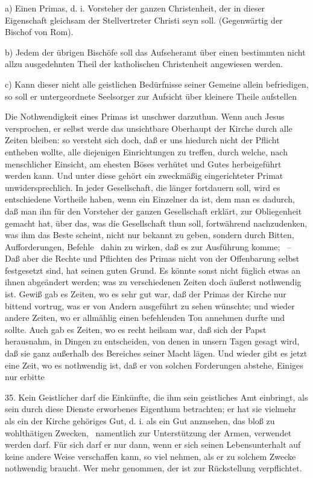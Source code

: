 {a) Einen Primas, d. i. Vorsteher der ganzen Christenheit, der in dieser Eigenschaft gleichsam der Stellvertreter Christi seyn soll. (Gegenwärtig der Bischof von Rom). \par
b) Jedem der übrigen Bischöfe soll das Aufseheramt über einen bestimmten nicht allzu ausgedehnten Theil der katholischen Christenheit angewiesen werden. \par
c) Kann dieser nicht alle geistlichen Bedürfnisse seiner Gemeine allein befriedigen, so soll er untergeordnete Seelsorger zur Aufsicht über kleinere Theile aufstellen \usw\ \par
Die Nothwendigkeit eines Primas ist unschwer darzuthun. Wenn auch Jesus versprochen, er selbst werde das unsichtbare Oberhaupt der Kirche durch alle Zeiten bleiben: so versteht sich doch, daß er uns hiedurch nicht der Pflicht entheben wollte, alle diejenigen Einrichtungen zu treffen, durch welche, nach menschlicher Einsicht, am ehesten Böses verhütet und Gutes herbeigeführt werden kann. Und unter diese gehört ein zweckmäßig eingerichteter Primat unwidersprechlich. In jeder Gesellschaft, die länger fortdauern soll, wird es entschiedene Vortheile haben, wenn ein Einzelner da ist, dem man es dadurch, daß man ihn für den Vorsteher der ganzen Gesellschaft erklärt, zur Obliegenheit gemacht hat, über das, was die Gesellschaft thun soll, fortwährend nachzudenken, was ihm das Beste scheint, nicht nur bekannt zu geben, sondern durch Bitten, Aufforderungen, Befehle \udgl\  dahin zu wirken, daß es zur Ausführung komme; \usw\  -- Daß aber die Rechte und Pflichten des Primas nicht von der Offenbarung selbst festgesetzt sind, hat seinen guten Grund. Es könnte sonst nicht füglich etwas an ihnen abgeändert werden; was zu verschiedenen Zeiten doch äußerst nothwendig ist. Gewiß gab es Zeiten, wo es sehr gut war, daß der Primas der Kirche nur bittend vortrug, was er von Andern ausgeführt zu sehen wünschte; und wieder andere Zeiten, wo er allmählig einen befehlenden Ton annehmen durfte und sollte. Auch gab es Zeiten, wo es recht heilsam war, daß sich der Papst herausnahm, in Dingen zu entscheiden, von denen in unsern Tagen gesagt wird, daß sie ganz außerhalb des Bereiches seiner Macht  lägen. Und wieder gibt es jetzt eine Zeit, wo es nothwendig ist, daß er von solchen Forderungen abstehe, Einiges nur erbitte \usw\ \par
35. Kein Geistlicher darf die Einkünfte, die ihm sein geistliches Amt einbringt, als sein durch diese Dienste erworbenes Eigenthum betrachten; er hat sie vielmehr als ein der Kirche gehöriges Gut, d. i. als ein Gut anznsehen, das bloß zu wohlthätigen Zwecken, \zB\ namentlich zur Unterstützung der Armen, verwendet werden darf. Für sich darf er nur dann, wenn er sich seinen Lebensunterhalt auf keine andere Weise verschaffen kann, so viel nehmen, als er zu solchem Zwecke nothwendig braucht. Wer mehr genommen, der ist zur Rückstellung verpflichtet. \par
}

